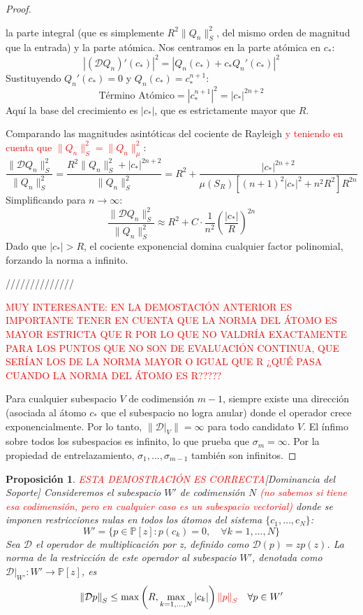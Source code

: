 \documentclass[12pt,a4paper]{article}
\newtheorem{proposicion}{Proposición}
\newcommand{\Poly}{\mathbb{P}[z]}
\newcommand{\norm}[1]{\left\| #1 \right\|_S}
\newcommand{\D}{\mathcal{D}}
\begin{document}
\begin{proof}
\begin{itemize}
    la parte integral (que es simplemente $R^2 \|Q_n\|_S^2$, del mismo orden de magnitud que la entrada) y la parte atómica. Nos centramos en la parte atómica en $c_*$:
    $$  |(\mathcal{D}Q_n)'(c_*)|^2 =  |Q_n(c_*) + c_* Q_n'(c_*)|^2 $$
    Sustituyendo  $Q_n'(c_*) = 0$ y  $Q_n(c_*) = c_*^{n+1}$:
    $$ \text{Término Atómico} =  |c_*^{n+1}|^2 =  |c_*|^{2n+2} $$
    Aquí la base del crecimiento es $|c_*|$, que es estrictamente mayor que $R$.
\end{itemize}

Comparando las magnitudes asintóticas del cociente de Rayleigh \textcolor{red}{y teniendo en cuenta que $\|Q_n\|_S^2= \|Q_n\|_{\mu}^2$}:
$$ \frac{\|\mathcal{D}Q_n\|_S^2}{\|Q_n\|_S^2} = \frac{R^2 \|Q_n\|_S^2 +  |c_*|^{2n+2}}{\|Q_n\|_S^2} = R^2 + \frac{ |c_*|^{2n+2}}{\mu(S_R) \left[ (n+1)^2 |c_*|^2 + n^2 R^2 \right] R^{2n}} $$
Simplificando para $n \to \infty$:
$$ \frac{\|\mathcal{D}Q_n\|_S^2}{\|Q_n\|_S^2} \approx R^2 + C \cdot \frac{1}{n^2} \left( \frac{|c_*|}{R} \right)^{2n} $$
Dado que $|c_*| > R$, el cociente exponencial domina cualquier factor polinomial, forzando la norma a infinito.


\noindent //////////////

\noindent \textcolor{red}{MUY INTERESANTE: EN LA DEMOSTACIÓN ANTERIOR ES IMPORTANTE TENER EN CUENTA QUE LA NORMA DEL ÁTOMO ES MAYOR ESTRICTA QUE R POR LO QUE NO VALDRÍA EXACTAMENTE PARA LOS PUNTOS QUE NO SON DE EVALUACIÓN CONTINUA, QUE SERÍAN LOS DE LA NORMA MAYOR O IGUAL QUE R ¿QUÉ PASA CUANDO LA NORMA DEL ÁTOMO ES R?????}


Para cualquier subespacio $V$ de codimensión $m-1$, siempre existe una dirección (asociada al átomo $c_*$ que el subespacio no logra anular) donde el operador crece exponencialmente. Por lo tanto, $\|\mathcal{D}|_V\| = \infty$ para todo candidato $V$.
El ínfimo sobre todos los subespacios es infinito, lo que prueba que $\sigma_m = \infty$. Por la propiedad de entrelazamiento, $\sigma_1, \dots, \sigma_{m-1}$ también son infinitos.
\end{proof}

\begin{proposicion} \textcolor{red}{ESTA DEMOSTRACIÓN ES CORRECTA}[Dominancia del Soporte]
Consideremos el subespacio $W'$ de codimensión $N$ \textcolor{red}{(no sabemos si tiene esa codimensión, pero en cualquier caso es un subespacio vectorial) }donde se imponen restricciones nulas en todos los átomos del sistema $\{c_1, \dots, c_N\}$:
$$ W' = \{ p \in \Poly : p(c_k) = 0, \quad \forall k=1,\dots,N \} $$
Sea $\D$ el operador de multiplicación por z, definido como $\D(p) = z p(z)$. La norma de la restricción de este operador al subespacio $W'$, denotada como $\D|_{W'} : W' \to \Poly$, es \begin{equation}
    \norm{\D p} \le \max \left( R, \max_{k=1,\dots,N} |c_k| \right) \textcolor{red}{\norm{ p}} \quad \forall p \in W'
\end{equation}
\end{proposicion}
\end{document}
